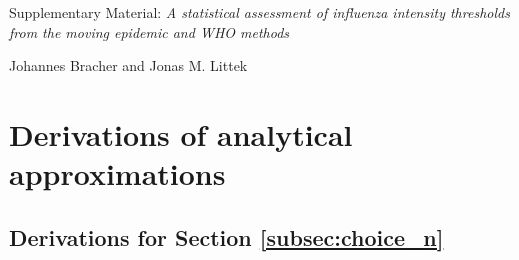 \documentclass{article}
\begin{document}
{\footnotesize


}

\newpage
\appendix


\renewcommand{\thepage}{S\arabic{page}}
\renewcommand{\thesection}{S\arabic{section}}
\renewcommand{\thetable}{S\arabic{table}}
\renewcommand{\thefigure}{S\arabic{figure}}
\setcounter{page}{1}
\setcounter{section}{0}
\setcounter{table}{0}
\setcounter{figure}{0}

\begin{center}
{\LARGE Supplementary Material: \textit{A statistical assessment of influenza intensity thresholds from the moving epidemic and WHO methods}}

\medskip

{\large Johannes Bracher and Jonas M. Littek}
\end{center}



\section{Derivations of analytical approximations}
\label{appendix:derivations}

\subsection{Derivations for Section \ref{subsec:choice_n}}
\label{appendix:derivation_n}
\end{document}
